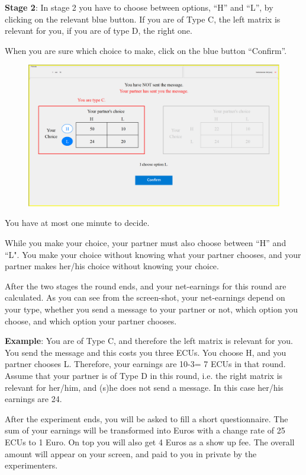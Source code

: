 \documentclass[12pt]{article}
\theoremstyle{break}
\begin{document}
\textbf{Stage 2}: In stage 2 you have to choose between options, ``H'' and ``L'', by clicking on the relevant blue button. 
If you are of Type C, the left matrix is relevant for you, if you are of type D, the right one.

When you are sure which choice to make, click on the blue button ``Confirm''.

 \begin{figure}[h]
   \centering
     \includegraphics[width=.9\textwidth]{fig3-FC-instructions.png}
   \label{fig:fig3-FC-instructions}
 \end{figure}
 

You have at most one minute to decide.

While you make your choice, your partner must also choose between ``H'' and ``L". You make your choice without knowing what your partner chooses, and your partner makes her/his choice without knowing your choice. 

After the two stages the round ends, and your net-earnings for this round are calculated. As you can see from the screen-shot, your net-earnings depend on your type, whether you send a message to your partner or not, which option you choose, and which option your partner chooses. 

\textbf{Example}: You are of Type C, and therefore the left matrix is relevant for you. You send the message and this costs you three ECUs. You choose H, and you partner chooses L. Therefore, your earnings are 10-3= 7 ECUs in that round. Assume that your partner is of Type D in this round, i.e. the right matrix is relevant for her/him, and (s)he does not send a message. In this case her/his earnings are 24. 

After the experiment ends, you will be asked to fill a short questionnaire. The sum of your earnings will be transformed into Euros with a change rate of 25 ECUs to 1 Euro. On top you will also get 4 Euros as a show up fee. The overall amount will appear on your screen, and paid to you in private by the experimenters. 
\end{document}
